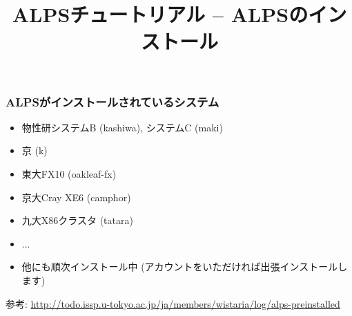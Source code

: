 \title{ALPSチュートリアル -- ALPSのインストール}



\begin{frame}
  \titlepage
\end{frame}


\begin{frame}[fragile]
  \frametitle{ALPSがインストールされているシステム}
  \begin{itemize}
  \item 物性研システムB (kashiwa), システムC (maki)
  \item 京 (k)
  \item 東大FX10 (oakleaf-fx)
  \item 京大Cray XE6 (camphor)
  \item 九大X86クラスタ (tatara)
  \item ...
  \item 他にも順次インストール中 (アカウントをいただければ出張インストールします)
  \end{itemize}
\begin{semiverbatim}
参考: {\footnotesize \url{http://todo.issp.u-tokyo.ac.jp/ja/members/wistaria/log/alps-preinstalled}}
\end{semiverbatim}
\end{frame}

